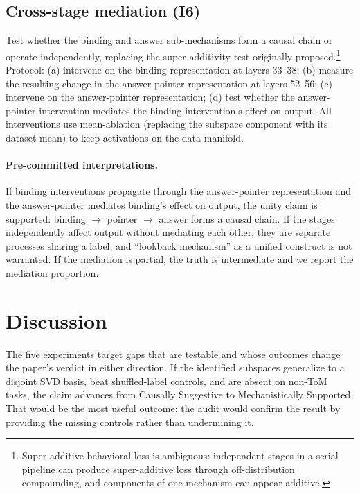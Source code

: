 \documentclass[11pt]{article}
\begin{document}
\subsection{Cross-stage mediation (I6)}
\label{sec:mediation}

Test whether the binding and answer sub-mechanisms form a causal chain or operate independently, replacing the super-additivity test originally proposed.\footnote{Super-additive behavioral loss is ambiguous: independent stages in a serial pipeline can produce super-additive loss through off-distribution compounding, and components of one mechanism can appear additive.} Protocol: (a) intervene on the binding representation at layers 33--38; (b) measure the resulting change in the answer-pointer representation at layers 52--56; (c) intervene on the answer-pointer representation; (d) test whether the answer-pointer intervention mediates the binding intervention's effect on output. All interventions use mean-ablation (replacing the subspace component with its dataset mean) to keep activations on the data manifold.

\paragraph{Pre-committed interpretations.} If binding interventions propagate through the answer-pointer representation and the answer-pointer mediates binding's effect on output, the unity claim is supported: binding $\to$ pointer $\to$ answer forms a causal chain. If the stages independently affect output without mediating each other, they are separate processes sharing a label, and ``lookback mechanism'' as a unified construct is not warranted. If the mediation is partial, the truth is intermediate and we report the mediation proportion.


\section{Discussion}
\label{sec:discussion}

The five experiments target gaps that are testable and whose outcomes change the paper's verdict in either direction. If the identified subspaces generalize to a disjoint SVD basis, beat shuffled-label controls, and are absent on non-ToM tasks, the claim advances from Causally Suggestive to Mechanistically Supported. That would be the most useful outcome: the audit would confirm the result by providing the missing controls rather than undermining it.
\end{document}

